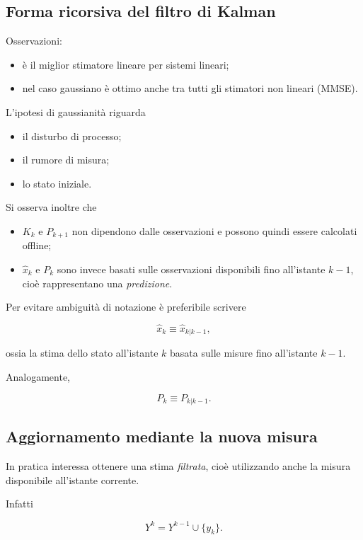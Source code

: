 \documentclass[11pt,a4paper]{article}
\begin{document}
\subsection*{Forma ricorsiva del filtro di Kalman}

Osservazioni:

\begin{itemize}
    \item è il miglior stimatore lineare per sistemi lineari;
    \item nel caso gaussiano è ottimo anche tra tutti gli stimatori non lineari (MMSE).
\end{itemize}

L'ipotesi di gaussianità riguarda

\begin{itemize}
    \item il disturbo di processo;
    \item il rumore di misura;
    \item lo stato iniziale.
\end{itemize}

Si osserva inoltre che

\begin{itemize}
    \item $K_k$ e $P_{k+1}$ non dipendono dalle osservazioni e possono quindi essere calcolati offline;
    \item $\hat{x}_k$ e $P_k$ sono invece basati sulle osservazioni disponibili fino all'istante $k-1$, cioè rappresentano una \emph{predizione}.
\end{itemize}

Per evitare ambiguità di notazione è preferibile scrivere

\[
\hat{x}_k
\equiv
\hat{x}_{k|k-1},
\]

ossia la stima dello stato all'istante $k$ basata sulle misure fino all'istante $k-1$.

Analogamente,

\[
P_k
\equiv
P_{k|k-1}.
\]

\subsection*{Aggiornamento mediante la nuova misura}

In pratica interessa ottenere una stima \emph{filtrata}, cioè utilizzando anche la misura disponibile all'istante corrente.

Infatti

\[
Y^k
=
Y^{k-1}
\cup
\{y_k\}.
\]
\end{document}
